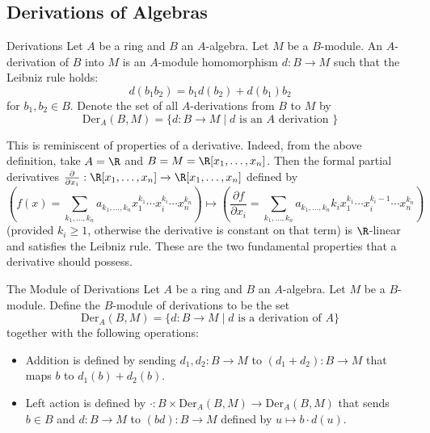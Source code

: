 \documentclass[a4paper]{article}
\begin{document}
\subsection{Derivations of Algebras}
\begin{defn}{Derivations}{} Let $A$ be a ring and $B$ an $A$-algebra. Let $M$ be a $B$-module. An $A$-derivation of $B$ into $M$ is an $A$-module homomorphism $d:B\to M$ such that the Leibniz rule holds: $$d(b_1b_2)=b_1d(b_2)+d(b_1)b_2$$ for $b_1,b_2\in B$. Denote the set of all $A$-derivations from $B$ to $M$ by $$\text{Der}_A(B,M)=\{d:B\to M\;|\;d\text{ is an }A\text{ derivation }\}$$
\end{defn}

This is reminiscent of properties of a derivative. Indeed, from the above definition, take $A=\R$ and $B=M=\R[x_1,\dots,x_n]$. Then the formal partial derivatives $\frac{\partial}{\partial x_i}:\R[x_1,\dots,x_n]\to\R[x_1,\dots,x_n]$ defined by $$\left(f(x)=\sum_{k_1,\dots,k_n}a_{k_1,\dots,k_n}x_1^{k_1}\cdots x_i^{k_i}\cdots x_n^{k_n}\right)\mapsto\left(\frac{\partial f}{\partial x_i}=\sum_{k_1,\dots,k_n}a_{k_1,\dots,k_n}k_ix_1^{k_1}\cdots x_i^{k_i-1}\cdots x_n^{k_n}\right)$$ (provided $k_i\geq 1$, otherwise the derivative is constant on that term) is $\R$-linear and satisfies the Leibniz rule. These are the two fundamental properties that a derivative should possess. 

\begin{defn}{The Module of Derivations}{} Let $A$ be a ring and $B$ an $A$-algebra. Let $M$ be a $B$-module. Define the $B$-module of derivations to be the set $$\text{Der}_A(B,M)=\{d:B\to M\;|\;d\text{ is a derivation of }A\}$$ together with the following operations: 
\begin{itemize}
\item Addition is defined by sending $d_1,d_2:B\to M$ to $(d_1+d_2):B\to M$ that maps $b$ to $d_1(b)+d_2(b)$. 
\item Left action is defined by $\cdot:B\times\text{Der}_A(B,M)\to\text{Der}_A(B,M)$ that sends $b\in B$ and $d:B\to M$ to $(bd):B\to M$ defined by $u\mapsto b\cdot d(u)$.
\end{itemize}
\end{defn}
\end{document}

